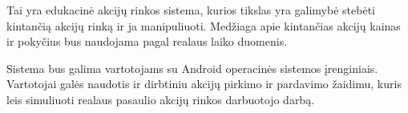 Tai yra edukacinė akcijų rinkos sistema, kurios tikslas yra galimybė stebėti kintančią akcijų rinką ir ja manipuliuoti. Medžiaga apie kintančias akcijų kainas ir pokyčius bus naudojama pagal realaus laiko duomenis.

Sistema bus galima vartotojams su Android operacinės sistemos įrenginiais. Vartotojai galės naudotis ir dirbtiniu akcijų pirkimo ir pardavimo žaidimu, kuris leis simuliuoti realaus pasaulio akcijų rinkos darbuotojo darbą.